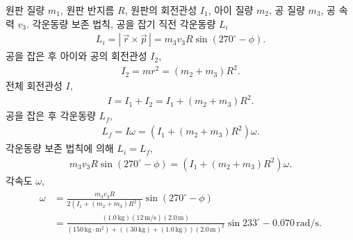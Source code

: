 \documentclass[floatfix,nofootinbib,superscriptaddress,fleqn]{revtex4-2}
\begin{document}
원판 질량 $m_1$, 원판 반지름 $R$, 원판의 회전관성 $I_1$, 
아이 질량 $m_2$, 공 질량 $m_3$, 공 속력 $v_3$.
각운동량 보존 법칙, 공을 잡기 직전 각운동량 $L_i$
\begin{align}
  L_i =|\,\vec{r}\times\vec{p}\,|
  = m_3v_3R\sin\left(270^\circ-\phi\right).
\end{align}
공을 잡은 후 아이와 공의 회전관성 $I_2$,
\begin{align}
  I_2 = mr^2 = (m_2+m_3)R^2.
\end{align} 
전체 회전관성 $I$,
\begin{align}
  I = I_1 + I_2 = I_1+(m_2+m_3)R^2.
\end{align}
공을 잡은 후 각운동량 $L_f$,
\begin{align}
  L_f = I\omega = (I_1+(m_2+m_3)R^2)\omega.
\end{align}
각운동량 보존 법칙에 의해 $L_i = L_f$,
\begin{align}
  m_3v_3R\sin\left(270^\circ-\phi\right)
  =(I_1+(m_2+m_3)R^2)\omega.
\end{align}
각속도 $\omega$,
\begin{align}
  \begin{split}
    \omega &= \frac{m_3v_3R}{2(I_1+(m_2+m_3)R^2)}\sin\left(270^\circ-\phi\right)  \\
    &= \frac{(1.0\,\mathrm{kg})(12\,\mathrm{m/s})(2.0\,\mathrm{m})}{(150\,\mathrm{kg\cdot m^2})
    +((30\,\mathrm{kg})+(1.0\,\mathrm{kg}))(2.0\,\mathrm{m})^2}\sin 233^\circ
    -0.070\,\mathrm{rad/s}.
  \end{split}
\end{align}
\vspace{1.cm}
\end{document}
